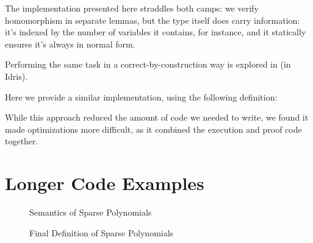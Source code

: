 \documentclass[draft, twocolumn]{article}
\theoremstyle{definition}
\theoremstyle{definition}
\begin{document}
The implementation presented here straddles both camps: we verify homomorphism
in separate lemmas, but the type itself does carry information: it's indexed by
the number of variables it contains, for instance, and it statically ensures
it's always in normal form.

Performing the same task in a correct-by-construction way is explored
in\cite{geuvers_automatically_2017} (in Idris\cite{brady_idris_2013}).

Here we provide a similar implementation, using the following definition:

While this approach reduced the amount of code we needed to write, we found it
made optimizations more difficult, as it combined the execution and proof code
together.


\newpage
\appendix
\section{Longer Code Examples}
\begin{figure}[h]
  \caption{Semantics of Sparse Polynomials}
  \label{semantics}
\end{figure}
\begin{figure}[h]
  \caption{Final Definition of Sparse Polynomials}
  \label{final-poly-def}
\end{figure}
\end{document}
